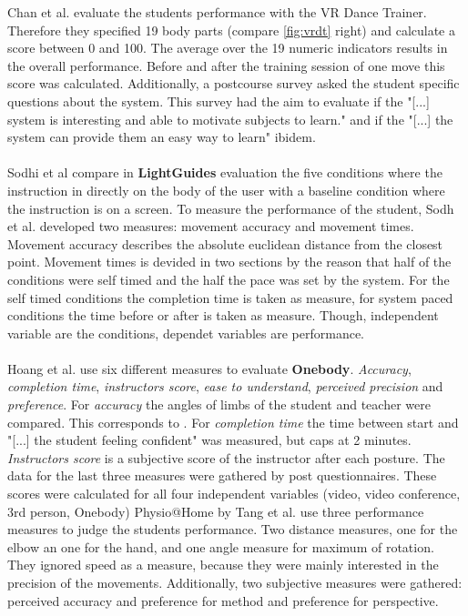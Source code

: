 Chan et al. evaluate the students performance with the VR Dance Trainer. Therefore they specified 19 body parts (compare \ref{fig:vrdt} right) and calculate a score between 0 and 100. The average over the 19 numeric indicators results in the overall performance. Before and after the training session of one move this score was calculated. Additionally, a postcourse survey asked the student specific questions about the system. This survey had the aim to evaluate if the "[...] system is interesting and able to motivate subjects to learn." \cite{Chan2011a} and if the "[...] the system can provide them an easy way to learn" ibidem.\\ \\
Sodhi et al \cite{Sodhi2012} compare in \textbf{LightGuides} evaluation the five conditions where the instruction in directly on the body of the user with a baseline condition where the instruction is on a screen. To measure the performance of the student, Sodh et al. developed two measures: movement accuracy and movement times. Movement accuracy describes the absolute euclidean distance from the closest point. Movement times is devided in two sections by the reason that half of the conditions were self timed and the half the pace was set by the system. For the self timed conditions the completion time is taken as measure, for system paced conditions the time before or after is taken as measure. Though, independent variable are the conditions, dependet variables are performance.\\ \\
Hoang et al. \cite{Hoang2016} use six different measures to evaluate \textbf{Onebody}. \textit{Accuracy}, \textit{completion time}, \textit{instructors score}, \textit{ease to understand}, \textit{perceived precision} and \textit{preference}. For \textit{accuracy} the angles of limbs of the student and teacher were compared. This corresponds to \todo. For \textit{completion time} the time between start and "[...] the student feeling confident" was measured, but caps at 2 minutes. \textit{Instructors score} is a subjective score of the instructor after each posture. The data for the last three measures were gathered by post questionnaires. These scores were calculated for all four independent variables (video, video conference, 3rd person, Onebody)
Physio@Home by Tang et al. \cite{Tang2015} use three performance measures to judge the students performance. Two distance measures, one for the elbow an one for the hand, and one angle measure for maximum of rotation. They ignored speed as a measure, because they were mainly interested in the precision of the movements. Additionally, two subjective measures were gathered: perceived accuracy and preference for method and preference for perspective.

